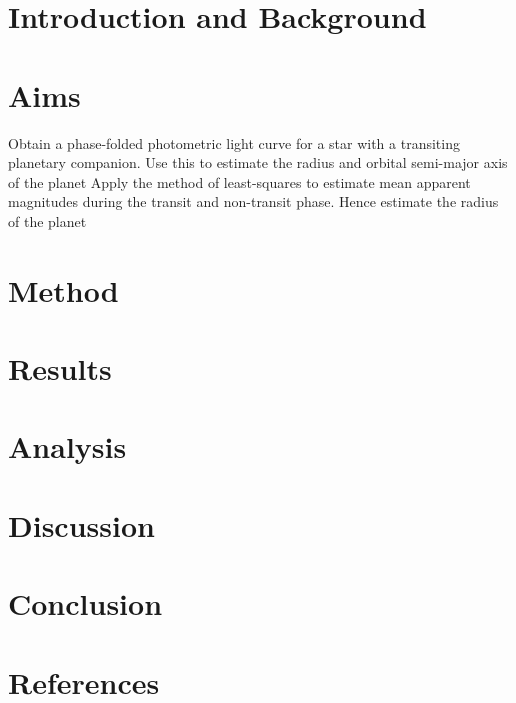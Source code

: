 \documentclass[]{article}
\begin{document}
\newpage
\section*{Introduction and Background}

\section*{Aims}

Obtain a phase-folded photometric light curve for a star with a transiting planetary companion. Use this to estimate the radius and orbital semi-major axis of the planet
Apply the method of least-squares to estimate mean apparent magnitudes during the transit and non-transit phase. Hence estimate the radius of the planet 





\section*{Method}

\section*{Results}

\section*{Analysis}
\section*{Discussion}

\section*{Conclusion}

\section*{References}
\end{document}
